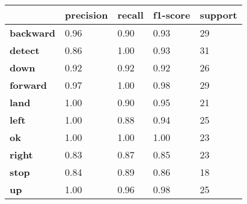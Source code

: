 \begin{table}[h]
    \centering
    \begin{tabular}{|lllll|}
        \hline
        \multicolumn{1}{|l|}{\textbf{}}             & \multicolumn{1}{l|}{\textbf{precision}} & \multicolumn{1}{l|}{\textbf{recall}} & \multicolumn{1}{l|}{\textbf{f1-score}} & \textbf{support} \\ \hline
        \multicolumn{1}{|l|}{\textbf{backward}}     & \multicolumn{1}{l|}{0.96}               & \multicolumn{1}{l|}{0.90}            & \multicolumn{1}{l|}{0.93}              & 29               \\ \hline
        \multicolumn{1}{|l|}{\textbf{detect}}       & \multicolumn{1}{l|}{0.86}               & \multicolumn{1}{l|}{1.00}            & \multicolumn{1}{l|}{0.93}              & 31               \\ \hline
        \multicolumn{1}{|l|}{\textbf{down}}         & \multicolumn{1}{l|}{0.92}               & \multicolumn{1}{l|}{0.92}            & \multicolumn{1}{l|}{0.92}              & 26               \\ \hline
        \multicolumn{1}{|l|}{\textbf{forward}}      & \multicolumn{1}{l|}{0.97}               & \multicolumn{1}{l|}{1.00}            & \multicolumn{1}{l|}{0.98}              & 29               \\ \hline
        \multicolumn{1}{|l|}{\textbf{land}}         & \multicolumn{1}{l|}{1.00}               & \multicolumn{1}{l|}{0.90}            & \multicolumn{1}{l|}{0.95}              & 21               \\ \hline
        \multicolumn{1}{|l|}{\textbf{left}}         & \multicolumn{1}{l|}{1.00}               & \multicolumn{1}{l|}{0.88}            & \multicolumn{1}{l|}{0.94}              & 25               \\ \hline
        \multicolumn{1}{|l|}{\textbf{ok}}           & \multicolumn{1}{l|}{1.00}               & \multicolumn{1}{l|}{1.00}            & \multicolumn{1}{l|}{1.00}              & 23               \\ \hline
        \multicolumn{1}{|l|}{\textbf{right}}        & \multicolumn{1}{l|}{0.83}               & \multicolumn{1}{l|}{0.87}            & \multicolumn{1}{l|}{0.85}              & 23               \\ \hline
        \multicolumn{1}{|l|}{\textbf{stop}}         & \multicolumn{1}{l|}{0.84}               & \multicolumn{1}{l|}{0.89}            & \multicolumn{1}{l|}{0.86}              & 18               \\ \hline
        \multicolumn{1}{|l|}{\textbf{up}}           & \multicolumn{1}{l|}{1.00}               & \multicolumn{1}{l|}{0.96}            & \multicolumn{1}{l|}{0.98}              & 25               \\ \hline

\end{tabular}
\end{table}
